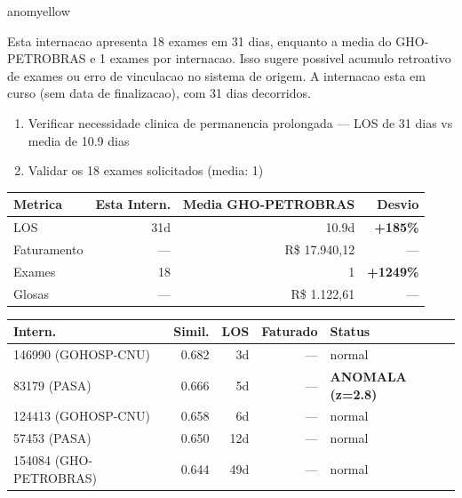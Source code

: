 \documentclass[a4paper,10pt]{article}
\begin{document}
\begin{anomalycard}[Internacao 166180 | GHO-PETROBRAS | MODERADO (z=2.70)]{anomyellow}
\vspace{2pt}\begin{tcolorbox}[colback=severityred!20,colframe=anomyellow,title={\textbf{Interpretacao de Negocio}},fonttitle=\bfseries\small,left=4pt,right=4pt,top=3pt,bottom=3pt]
{\small Esta internacao apresenta 18 exames em 31 dias, enquanto a media do GHO-PETROBRAS e 1 exames por internacao. Isso sugere possivel acumulo retroativo de exames ou erro de vinculacao no sistema de origem. A internacao esta em curso (sem data de finalizacao), com 31 dias decorridos.}
\end{tcolorbox}
\begin{tcolorbox}[colback=severityyellow!30,colframe=anomorange,title={\textbf{Recomendacoes Especificas}},fonttitle=\bfseries\small,left=4pt,right=4pt,top=3pt,bottom=3pt]
\begin{enumerate}[nosep,leftmargin=16pt]
\item {\small Verificar necessidade clinica de permanencia prolongada --- LOS de 31 dias vs media de 10.9 dias}
\item {\small Validar os 18 exames solicitados (media: 1)}
\end{enumerate}
\end{tcolorbox}
\begin{center}\begin{tabular}{l r r r}\toprule\textbf{Metrica} & \textbf{Esta Intern.} & \textbf{Media GHO-PETROBRAS} & \textbf{Desvio} \\\midrule
LOS & 31d & 10.9d & \textcolor{anomred}{\textbf{+185\%}} \\
Faturamento & --- & R\$ 17.940,12 & --- \\
Exames & 18 & 1 & \textcolor{anomred}{\textbf{+1249\%}} \\
Glosas & --- & R\$ 1.122,61 & --- \\
\bottomrule\end{tabular}\end{center}

\begin{tabular}{l r r r l}\toprule\textbf{Intern.} & \textbf{Simil.} & \textbf{LOS} & \textbf{Faturado} & \textbf{Status} \\\midrule
146990 (GOHOSP-CNU) & 0.682 & 3d & --- & \textcolor{jcubeblue}{normal} \\
83179 (PASA) & 0.666 & 5d & --- & \textcolor{anomred}{\textbf{ANOMALA (z=2.8)}} \\
124413 (GOHOSP-CNU) & 0.658 & 6d & --- & \textcolor{jcubeblue}{normal} \\
57453 (PASA) & 0.650 & 12d & --- & \textcolor{jcubeblue}{normal} \\
154084 (GHO-PETROBRAS) & 0.644 & 49d & --- & \textcolor{jcubeblue}{normal} \\
\bottomrule\end{tabular}


\end{anomalycard}
\end{document}

